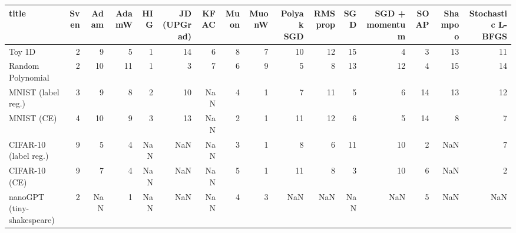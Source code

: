 \begin{tabular}{lrrrrrrrrrrrrrrr}
\toprule
title & Sven & Adam & AdamW & HIG & JD (UPGrad) & KFAC & Muon & MuonW & Polyak SGD & RMSprop & SGD & SGD + momentum & SOAP & Shampoo & Stochastic L-BFGS \\
\midrule
Toy 1D & 2 & 9 & 5 & 1 & 14 & 6 & 8 & 7 & 10 & 12 & 15 & 4 & 3 & 13 & 11 \\
Random Polynomial & 2 & 10 & 11 & 1 & 3 & 7 & 6 & 9 & 5 & 8 & 13 & 12 & 4 & 15 & 14 \\
MNIST (label reg.) & 3 & 9 & 8 & 2 & 10 & NaN & 4 & 1 & 7 & 11 & 5 & 6 & 14 & 13 & 12 \\
MNIST (CE) & 4 & 10 & 9 & 3 & 13 & NaN & 2 & 1 & 11 & 12 & 6 & 5 & 14 & 8 & 7 \\
CIFAR-10 (label reg.) & 9 & 5 & 4 & NaN & NaN & NaN & 3 & 1 & 8 & 6 & 11 & 10 & 2 & NaN & 7 \\
CIFAR-10 (CE) & 9 & 7 & 4 & NaN & NaN & NaN & 5 & 1 & 11 & 8 & 3 & 10 & 6 & NaN & 2 \\
nanoGPT (tiny-shakespeare) & 2 & NaN & 1 & NaN & NaN & NaN & 4 & 3 & NaN & NaN & NaN & NaN & 5 & NaN & NaN \\
\bottomrule
\end{tabular}
